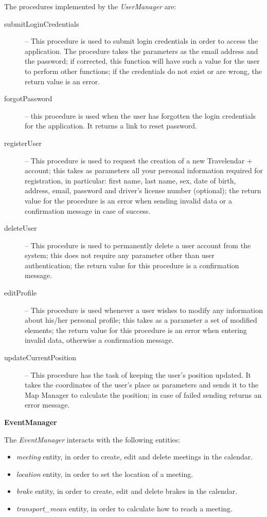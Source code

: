 \documentclass{article}
\begin{document}
	\bigskip
	The procedures implemented by the \textit{UserManager} are:
	\begin{description}
	\item [submitLoginCredentials] -- This procedure is used to submit login credentials in order to access the application. The procedure takes the parameters as the email address and the password; if corrected, this function will have such a value for the user to perform other functions; if the credentials do not exist or are wrong, the return value is an error.
	\item [forgotPassword] -- this procedure is used when the user has forgotten the login credentials for the application. It returns a link to reset password.
	\item [registerUser] -- This procedure is used to request the creation of a new Travelendar + account; this takes as parameters all your personal information required for registration, in particular: first name, last name, sex, date of birth, address, email, password and driver's license number (optional); the return value for the procedure is an error when sending invalid data or a confirmation message in case of success.
	\item [deleteUser] -- This procedure is used to permanently delete a user account from the system; this does not require any parameter other than user authentication; the return value for this procedure is a confirmation message.
	\item [editProfile] -- This procedure is used whenever a user wishes to modify any information about his/her personal profile; this takes as a parameter a set of modified elements; the return value for this procedure is an error when entering invalid data, otherwise a confirmation message.
	\item [updateCurrentPosition] -- This procedure has the task of keeping the user's position updated. It takes the coordinates of the user’s place as parameters and sends it to the Map Manager to calculate the position; in case of failed sending returns an error message.
	\end{description}

	\bigskip
	\noindent
	\textbf{EventManager}

	\bigskip
	\noindent
	The \textit{EventManager} interacts with the following entities:
	\begin{itemize}
	\item \textit{meeting} entity, in order to create, edit and delete meetings in the calendar.
	\item \textit{location} entity, in order to set the location of a meeting.
	\item \textit{brake} entity, in order to create, edit and delete brakes in the calendar.
	\item \textit{transport\_mean} entity, in order to calculate how to reach a meeting.
	\end{itemize}
\end{document}
